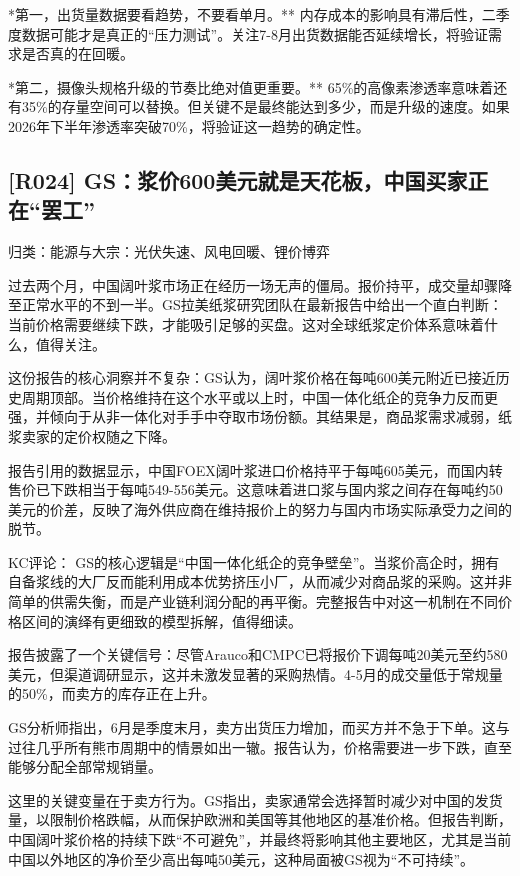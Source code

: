 \documentclass[11pt]{ctexart}
\begin{document}
*第一，出货量数据要看趋势，不要看单月。** 内存成本的影响具有滞后性，二季度数据可能才是真正的“压力测试”。关注7-8月出货数据能否延续增长，将验证需求是否真的在回暖。

*第二，摄像头规格升级的节奏比绝对值更重要。** 65\%的高像素渗透率意味着还有35\%的存量空间可以替换。但关键不是最终能达到多少，而是升级的速度。如果2026年下半年渗透率突破70\%，将验证这一趋势的确定性。

\subsection{[R024] GS：浆价600美元就是天花板，中国买家正在“罢工”}
{\small\color{refgray}归类：能源与大宗：光伏失速、风电回暖、锂价博弈}

过去两个月，中国阔叶浆市场正在经历一场无声的僵局。报价持平，成交量却骤降至正常水平的不到一半。GS拉美纸浆研究团队在最新报告中给出一个直白判断：当前价格需要继续下跌，才能吸引足够的买盘。这对全球纸浆定价体系意味着什么，值得关注。

这份报告的核心洞察并不复杂：GS认为，阔叶浆价格在每吨600美元附近已接近历史周期顶部。当价格维持在这个水平或以上时，中国一体化纸企的竞争力反而更强，并倾向于从非一体化对手手中夺取市场份额。其结果是，商品浆需求减弱，纸浆卖家的定价权随之下降。

报告引用的数据显示，中国FOEX阔叶浆进口价格持平于每吨605美元，而国内转售价已下跌相当于每吨549-556美元。这意味着进口浆与国内浆之间存在每吨约50美元的价差，反映了海外供应商在维持报价上的努力与国内市场实际承受力之间的脱节。

KC评论： GS的核心逻辑是“中国一体化纸企的竞争壁垒”。当浆价高企时，拥有自备浆线的大厂反而能利用成本优势挤压小厂，从而减少对商品浆的采购。这并非简单的供需失衡，而是产业链利润分配的再平衡。完整报告中对这一机制在不同价格区间的演绎有更细致的模型拆解，值得细读。

报告披露了一个关键信号：尽管Arauco和CMPC已将报价下调每吨20美元至约580美元，但渠道调研显示，这并未激发显著的采购热情。4-5月的成交量低于常规量的50\%，而卖方的库存正在上升。

GS分析师指出，6月是季度末月，卖方出货压力增加，而买方并不急于下单。这与过往几乎所有熊市周期中的情景如出一辙。报告认为，价格需要进一步下跌，直至能够分配全部常规销量。

这里的关键变量在于卖方行为。GS指出，卖家通常会选择暂时减少对中国的发货量，以限制价格跌幅，从而保护欧洲和美国等其他地区的基准价格。但报告判断，中国阔叶浆价格的持续下跌“不可避免”，并最终将影响其他主要地区，尤其是当前中国以外地区的净价至少高出每吨50美元，这种局面被GS视为“不可持续”。
\end{document}
